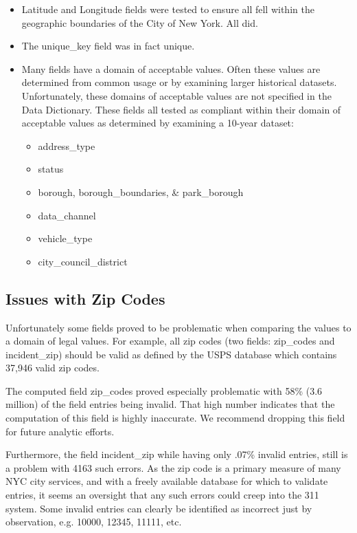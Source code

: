 \documentclass[12pt, titlepage]{article}
\begin{document}
\begin{itemize}
	\item Latitude and Longitude fields were tested to ensure all fell within the geographic boundaries of the City of New York. All did.
	\item The unique\_key field was in fact unique.
	\item Many fields have a domain of acceptable values. Often these values are determined from common usage or by examining
	larger historical datasets. Unfortunately, these domains of acceptable values are not specified in the Data Dictionary. These fields all tested as
	compliant within their domain of acceptable values as determined by examining a 10-year dataset:
		\begin{itemize}
			\item address\_type
			\item status
			\item borough, borough\_boundaries, \& park\_borough 
			\item data\_channel
			\item vehicle\_type
			\item city\_council\_district
		\end{itemize}
\end{itemize}	

	\subsection{Issues with Zip Codes}
	\label{sec:zipcodesissues}
	 Unfortunately some fields proved to be  problematic when comparing the values to a domain of legal values.
	 For example, all zip codes (two fields: zip\_codes and incident\_zip) should be valid as defined by the USPS database
	 which contains 37,946 valid zip codes.
	 
	The computed field zip\_codes proved especially problematic with 58\% (3.6 million) of the field entries being invalid.
	That high number indicates that the computation of this field is highly inaccurate. We recommend
	dropping this field for future analytic efforts.
	
	Furthermore, the field incident\_zip while having only .07\% invalid entries, still is a problem with 4163 such errors.
	As the zip code is a primary measure of many NYC city services, 
	and with a freely available database for which to validate entries, it seems an oversight 
	that any such errors could creep into the 311 system. Some invalid entries can  
	clearly be identified as incorrect just by observation, e.g. 10000, 12345, 11111, etc. 
	
\end{document}
